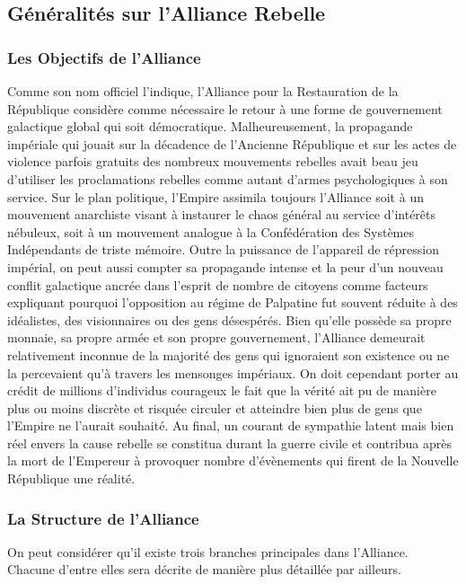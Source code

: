 \documentclass[twoside]{article}
\begin{document}
\subsection{Généralités sur l'Alliance Rebelle }
\subsubsection{Les Objectifs de l'Alliance}
Comme son nom officiel l'indique, l'Alliance pour la Restauration de la République considère comme nécessaire le retour à une forme de gouvernement galactique global qui soit démocratique. Malheureusement, la propagande impériale qui jouait sur la décadence de l'Ancienne République et sur les actes de violence parfois gratuits des nombreux mouvements rebelles avait beau jeu d'utiliser les proclamations rebelles comme autant d'armes psychologiques à son service. Sur le plan politique, l'Empire assimila toujours l'Alliance soit à un mouvement anarchiste visant à instaurer le chaos général au service d'intérêts nébuleux, soit à un mouvement analogue à la Confédération des Systèmes Indépendants de triste mémoire. Outre la puissance de l'appareil de répression impérial, on peut aussi compter sa propagande intense et la peur d'un nouveau conflit galactique ancrée dans l'esprit de nombre de citoyens comme facteurs expliquant pourquoi l'opposition au régime de Palpatine fut souvent réduite à des idéalistes, des visionnaires ou des gens désespérés. Bien qu'elle possède sa propre monnaie, sa propre armée et son propre gouvernement, l'Alliance demeurait relativement inconnue de la majorité des gens qui ignoraient son existence ou ne la percevaient qu'à travers les mensonges impériaux. On doit cependant porter au crédit de millions d'individus courageux le fait que la vérité ait pu de manière plus ou moins discrète et risquée circuler et atteindre bien plus de gens que l'Empire ne l'aurait souhaité. Au final, un courant de sympathie latent mais bien réel envers la cause rebelle se constitua durant la guerre civile et contribua après la mort de l'Empereur à provoquer nombre d'évènements qui firent de la Nouvelle République une réalité.

\subsubsection{La Structure de l'Alliance}
On peut considérer qu'il existe trois branches principales dans l'Alliance. Chacune d'entre elles sera décrite de manière plus détaillée par ailleurs.
\end{document}
